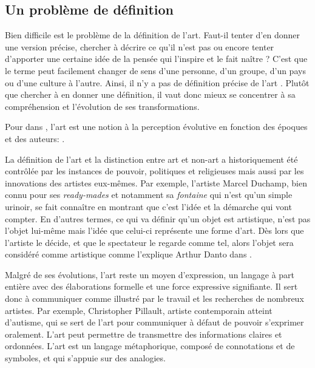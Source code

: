 \documentclass[12pt]{article} %
\begin{document}
\subsection{Un problème de définition}
Bien difficile est le problème de la définition de l'art. Faut-il tenter d'en donner une version précise, chercher à décrire ce qu'il n'est pas ou encore tenter d'apporter une certaine idée de la pensée qui l'inspire et le fait naître ? C'est que le terme peut facilement changer de sens d'une personne, d'un groupe, d'un pays ou d'une culture à l'autre. Ainsi, il n'y a pas de définition précise de l'art \cite{SDavies1991}. Plutôt que chercher à en donner une définition, il vaut donc mieux se concentrer à sa compréhension et l'évolution de ses transformations. 

Pour \citeauthor{SDavies1991} dans , l'art est une notion à la perception évolutive en fonction des époques et des auteurs:  \cite{SDavies1991}. 

La définition de l'art et la distinction entre art et non-art a historiquement été contrôlée par les instances de pouvoir, politiques et religieuses mais aussi par les innovations des artistes eux-mêmes. Par exemple, l'artiste Marcel Duchamp, bien connu pour ses \textit{ready-mades} et notamment sa \textit{fontaine} qui n'est qu'un simple urinoir, se fait connaître en montrant que c'est l'idée et la démarche qui vont compter. En d'autres termes, ce qui va définir qu'un objet est artistique, n'est pas l'objet lui-même mais l'idée que celui-ci représente une forme d'art. Dès lors que l'artiste le décide, et que le spectateur le regarde comme tel, alors l'objet sera considéré comme artistique comme l'explique Arthur Danto dans  \cite{ADanto1989}. 

Malgré de ses évolutions, l'art reste un moyen d'expression, un langage à part entière avec des élaborations formelle et une force expressive signifiante. Il sert donc à communiquer comme illustré par le travail et les recherches de nombreux artistes. Par exemple, Christopher Pillault, artiste contemporain atteint d'autisme, qui se sert de l'art pour communiquer à défaut de pouvoir s'exprimer oralement. L'art peut permettre de transmettre des informations claires et ordonnées. L'art est un langage métaphorique, composé de connotations et de symboles, et qui s'appuie sur des analogies. 
\end{document}
